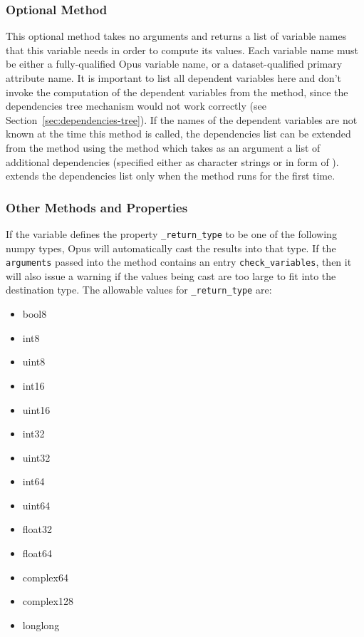 {\subsubsection{Optional Method }
 
\label{sec:dependencies}
%
This optional method takes no arguments and returns a list of variable \variablesindex names
that this variable \variablesindex needs in order to compute its values. Each variable \variablesindex name
must be either a fully-qualified Opus variable \variablesindex name, or a dataset-qualified \datasetindex
primary attribute \primaryattributesindex name. It is important to list all dependent variables \variablesindex
here and don't invoke the computation of the dependent variables \variablesindex from the
 method, since the dependencies tree mechanism would not
work correctly (see Section~\ref{sec:dependencies-tree}). If the names of the
dependent variables \variablesindex are not known at the time this method is called, the
dependencies list can be extended from the  method using the
 \variablesindex method  which takes as an argument
a list of additional dependencies (specified either as character strings or in
form of ). \attributesindex {} extends the
dependencies list only when the  method runs for the first
time.

\subsubsection{Other Methods and Properties}
%
If the variable \variablesindex defines the property \verb|_return_type| to be one of the
following numpy types, Opus will automatically cast the results into that
type.  If the \verb|arguments| passed into the  method
contains an entry \verb|check_variables|, \variablesindex then it will also issue a warning if
the values being cast are too large to fit into the destination type.  The
allowable values for \verb|_return_type| are:
\begin{itemize}
\tight
\item bool8
\item int8
\item uint8
\item int16
\item uint16
\item int32
\item uint32
\item int64
\item uint64
\item float32
\item float64
\item complex64
\item complex128
\item longlong
\end{itemize}

}
